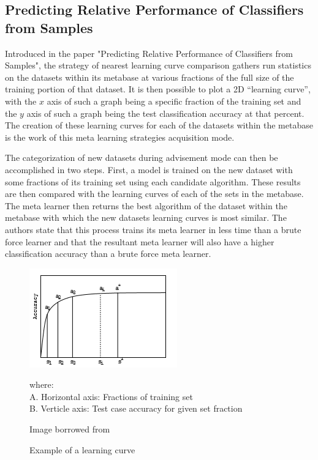 \subsection{Predicting Relative Performance of Classifiers from Samples}
Introduced in the paper "Predicting Relative Performance of Classifiers from
Samples", the strategy of nearest learning curve comparison gathers run
statistics on the datasets within its metabase at various fractions of the full
size of the training portion of that dataset. It is then possible to plot a 2D
``learning curve'', with the $x$ axis of such a graph being a specific fraction
of the training set and the $y$ axis of such a graph being the test classification
accuracy at that percent. The creation of these learning curves for each of the
datasets within the metabase is the work of this meta learning strategies
acquisition mode.

The categorization of new datasets during advisement mode can then be
accomplished in two steps. First, a model is trained on the new dataset with
some fractions of its training set using each candidate algorithm. These results
are then compared with the learning curves of each of the sets in the metabase.
The meta learner then returns the best algorithm of the dataset within the
metabase with which the new datasets learning curves is most similar. The
authors state that this process trains its meta learner in less time than a
brute force learner and that the resultant meta learner will also have a higher
classification accuracy than a brute force meta learner.

\begin{figure}[h]
\includegraphics{Chapters/Images/LearningCurve/LearningCurve.PNG}
\caption{Example of a learning curve}
\centering
\begin{flushleft}
where: \\
A. Horizontal axis: Fractions of training set \\
B. Verticle axis: Test case accuracy for given set fraction \\
\end{flushleft}
Image borrowed from \cite{Leite}
\end{figure}
